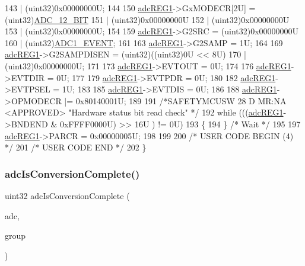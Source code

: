 \begin{DoxyCode}
143                          | (uint32)0x00000000U;
144 
150     \mbox{\hyperlink{reg__adc_8h_a3b9540af9f841ba3127f14b1c9208c57}{adcREG1}}->GxMODECR[2U] = (uint32)\mbox{\hyperlink{adc_8h_acb5182ec6ffe79ad3a12c33fe2a8c6bbad68550b9c51106cbc8310d2dbd9b7a72}{ADC\_12\_BIT}}
151                           | (uint32)0x00000000U
152                           | (uint32)0x00000000U
153                           | (uint32)0x00000000U;
154 
159     \mbox{\hyperlink{reg__adc_8h_a3b9540af9f841ba3127f14b1c9208c57}{adcREG1}}->G2SRC = (uint32)0x00000000U
160                    | (uint32)\mbox{\hyperlink{adc_8h_a13aceea9ced6ca89d6c6ab3fe2ab910caadc2f5ee45815b73e5e4b86b3d75ae56}{ADC1\_EVENT}};
161 
163     \mbox{\hyperlink{reg__adc_8h_a3b9540af9f841ba3127f14b1c9208c57}{adcREG1}}->G2SAMP = 1U;
164 
169     \mbox{\hyperlink{reg__adc_8h_a3b9540af9f841ba3127f14b1c9208c57}{adcREG1}}->G2SAMPDISEN = (uint32)((uint32)0U << 8U)
170                          | (uint32)0x00000000U;
171 
173     \mbox{\hyperlink{reg__adc_8h_a3b9540af9f841ba3127f14b1c9208c57}{adcREG1}}->EVTOUT = 0U;
174 
176     \mbox{\hyperlink{reg__adc_8h_a3b9540af9f841ba3127f14b1c9208c57}{adcREG1}}->EVTDIR = 0U;
177     
179     \mbox{\hyperlink{reg__adc_8h_a3b9540af9f841ba3127f14b1c9208c57}{adcREG1}}->EVTPDR = 0U;
180 
182     \mbox{\hyperlink{reg__adc_8h_a3b9540af9f841ba3127f14b1c9208c57}{adcREG1}}->EVTPSEL = 1U;
183 
185     \mbox{\hyperlink{reg__adc_8h_a3b9540af9f841ba3127f14b1c9208c57}{adcREG1}}->EVTDIS = 0U;
186     
188     \mbox{\hyperlink{reg__adc_8h_a3b9540af9f841ba3127f14b1c9208c57}{adcREG1}}->OPMODECR |= 0x80140001U;
189     
191     \textcolor{comment}{/*SAFETYMCUSW 28 D MR:NA <APPROVED> "Hardware status bit read check" */}
192     \textcolor{keywordflow}{while} (((\mbox{\hyperlink{reg__adc_8h_a3b9540af9f841ba3127f14b1c9208c57}{adcREG1}}->BNDEND & 0xFFFF0000U) >> 16U ) != 0U) 
193     \{ 
194     \} \textcolor{comment}{/* Wait */}
195     
197     \mbox{\hyperlink{reg__adc_8h_a3b9540af9f841ba3127f14b1c9208c57}{adcREG1}}->PARCR = 0x00000005U;
198 
199 
200 \textcolor{comment}{/* USER CODE BEGIN (4) */}
201 \textcolor{comment}{/* USER CODE END */}
202 \}
\end{DoxyCode}
\mbox{\label{group__ADC_ga8bad75e5bea34cb9eaec0ca8a3cb6dcb}} 
\subsubsection{\texorpdfstring{adc\+Is\+Conversion\+Complete()}{adcIsConversionComplete()}}
{\footnotesize\ttfamily uint32 adc\+Is\+Conversion\+Complete (\begin{DoxyParamCaption}\item[{\mbox{\hyperlink{reg__adc_8h_ab98b3b090eb1fd96596cd337a5fc0a4e}{adc\+B\+A\+S\+E\+\_\+t}} $\ast$}]{adc,  }\item[{uint32}]{group }\end{DoxyParamCaption})}



